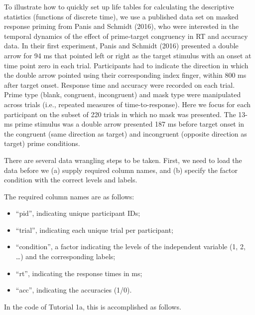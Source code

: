 \documentclass[
  man, donotrepeattitle,floatsintext]{apa6}
\providecommand{\tightlist}{%
  \setlength{\itemsep}{0pt}\setlength{\parskip}{0pt}}
\begin{document}
To illustrate how to quickly set up life tables for calculating the descriptive statistics (functions of discrete time), we use a published data set on masked response priming from Panis and Schmidt (2016), who were interested in the temporal dynamics of the effect of prime-target congruency in RT and accuracy data.
In their first experiment, Panis and Schmidt (2016) presented a double arrow for 94 ms that pointed left or right as the target stimulus with an onset at time point zero in each trial. Participants had to indicate the direction in which the double arrow pointed using their corresponding index finger, within 800 ms after target onset. Response time and accuracy were recorded on each trial. Prime type (blank, congruent, incongruent) and mask type were manipulated across trials (i.e., repeated measures of time-to-response). Here we focus for each participant on the subset of 220 trials in which no mask was presented. The 13-ms prime stimulus was a double arrow presented 187 ms before target onset in the congruent (same direction as target) and incongruent (opposite direction as target) prime conditions.

There are several data wrangling steps to be taken. First, we need to load the data before we (a) supply required column names, and (b) specify the factor condition with the correct levels and labels.

The required column names are as follows:

\begin{itemize}
\tightlist
\item
  ``pid'', indicating unique participant IDs;
\item
  ``trial'', indicating each unique trial per participant;
\item
  ``condition'', a factor indicating the levels of the independent variable (1, 2, \ldots) and the corresponding labels;
\item
  ``rt'', indicating the response times in ms;
\item
  ``acc'', indicating the accuracies (1/0).
\end{itemize}

In the code of Tutorial 1a, this is accomplished as follows.

\footnotesize
\end{document}
